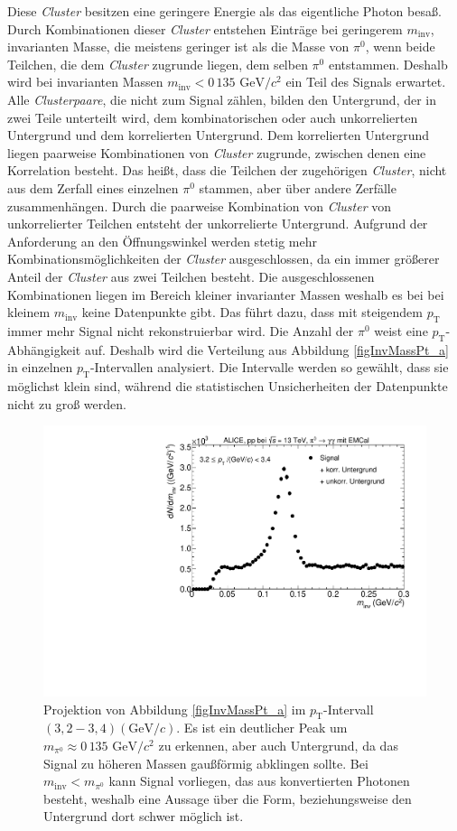 Diese \textit{Cluster} besitzen eine geringere Energie als das eigentliche Photon besaß.
Durch Kombinationen dieser \textit{Cluster} entstehen Einträge bei geringerem $m_\text{inv}$,
 invarianten Masse, die meistens geringer ist als die Masse von $\pi^{0}$, wenn beide Teilchen, die dem \textit{Cluster} zugrunde liegen, dem selben $\pi^{0}$ entstammen.
Deshalb wird bei invarianten Massen $m_\text{inv}<0\,135\text{ GeV}/c^{2}$ ein Teil des Signals erwartet.
\newline
Alle \textit{Clusterpaare}, die nicht zum Signal zählen, bilden den Untergrund, der in zwei Teile unterteilt wird, dem kombinatorischen oder auch unkorrelierten Untergrund und dem korrelierten Untergrund.
Dem korrelierten Untergrund liegen paarweise Kombinationen von \textit{Cluster} zugrunde, zwischen denen eine Korrelation besteht.
Das heißt, dass die Teilchen der zugehörigen \textit{Cluster}, nicht aus dem Zerfall eines einzelnen $\pi^{0}$ stammen, aber über andere Zerfälle zusammenhängen.
Durch die paarweise Kombination von \textit{Cluster} von unkorrelierter Teilchen entsteht der unkorrelierte Untergrund.
\newline
Aufgrund der Anforderung an den Öffnungswinkel werden stetig mehr Kombinationsmöglichkeiten der \textit{Cluster} ausgeschlossen, da ein immer  größerer Anteil der \textit{Cluster} aus zwei Teilchen besteht.
Die ausgeschlossenen Kombinationen liegen im Bereich kleiner invarianter Massen weshalb es bei bei kleinem $m_{\text{inv}}$ keine Datenpunkte gibt.
Das führt dazu, dass mit steigendem $p_{\text{T}}$ immer mehr Signal nicht rekonstruierbar wird.
\newline
Die Anzahl der $\pi^{0}$ weist eine $p_{\text{T}}$-Abhängigkeit auf.
Deshalb wird die Verteilung aus Abbildung \ref{figInvMassPt_a} in einzelnen $p_{\text{T}}$-Intervallen analysiert.
Die Intervalle werden so gewählt, dass sie möglichst klein sind, während die statistischen Unsicherheiten der Datenpunkte nicht zu groß werden.
\begin{figure}[tbp]
\centering
\includegraphics[width=.75\linewidth]{hSignalPlusBkg.pdf}
\caption{Projektion von Abbildung \ref{figInvMassPt_a} im $p_{\text{T}}$-Intervall $(3,2 - 3,4) (\text{GeV/}c)$. Es ist ein deutlicher Peak um $m_{\pi^{0}} \approx 0\,135\text{ GeV/}c^{2}$ zu erkennen, aber auch Untergrund, da das Signal zu höheren Massen gaußförmig abklingen sollte. Bei $m_{\text{inv}} < m_{\pi^{0}}$ kann Signal vorliegen, das aus konvertierten Photonen besteht, weshalb eine Aussage über die Form, beziehungsweise den Untergrund dort schwer möglich ist.}
\label{figSignalPlusBkg}
\end{figure}
